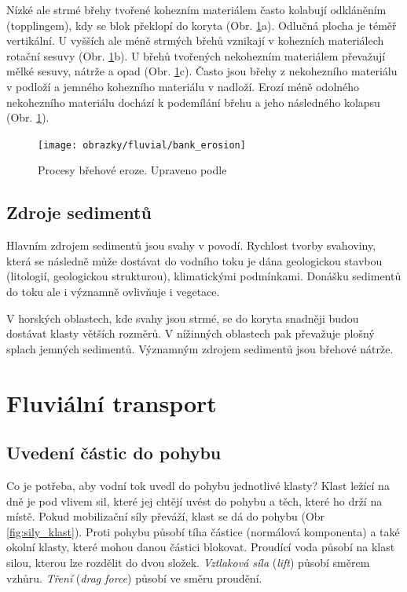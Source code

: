 Nízké ale strmé břehy tvořené kohezním materiálem často kolabují odkláněním (topplingem), kdy se blok překlopí do koryta (Obr. \ref{fig:bankerosion}a). Odlučná plocha je téměř vertikální. U vyšších ale méně strmých břehů vznikají v kohezních materiálech rotační sesuvy (Obr. \ref{fig:bankerosion}b). U břehů tvořených nekohezním materiálem převažují mělké sesuvy, nátrže a opad (Obr. \ref{fig:bankerosion}c). Často jsou břehy z nekohezního materiálu v podloží a jemného kohezního materiálu v nadloží. Erozí méně odolného nekohezního materiálu dochází k podemílání břehu a jeho následného kolapsu (Obr. \ref{fig:bankerosion}).

\begin{figure}
	\centering
	\texttt{[image: obrazky/fluvial/bank\_erosion]}
	\caption{Procesy břehové eroze. Upraveno podle \textcite{charltonFundamentalsFluvialGeomorphology2007}}
	\label{fig:bankerosion}
\end{figure}

\subsection{Zdroje sedimentů}
Hlavním zdrojem sedimentů jsou svahy v povodí. Rychlost tvorby svahoviny, která se následně může dostávat do vodního toku je dána geologickou stavbou (litologií, geologickou strukturou), klimatickými podmínkami. Donášku sedimentů do toku ale i významně ovlivňuje i vegetace. 

V horských oblastech, kde svahy jsou strmé, se do koryta snadněji budou dostávat klasty větších rozměrů. V nížinných oblastech pak převažuje plošný splach jemných sedimentů. Významným zdrojem sedimentů jsou břehové nátrže. 

\section{Fluviální transport}
\subsection{Uvedení částic do pohybu}
Co je potřeba, aby vodní tok uvedl do pohybu jednotlivé klasty? Klast ležící na dně je pod vlivem sil, které jej chtějí uvést do pohybu a těch, které ho drží na místě. Pokud mobilizační síly převáží, klast se dá do pohybu (Obr \ref{fig:sily_klast}). Proti pohybu působí tíha částice (normálová komponenta) a také okolní klasty, které mohou danou částici blokovat. Proudící voda působí na klast silou, kterou lze rozdělit do dvou složek. \emph{Vztlaková síla} (\textit{lift}) působí směrem vzhůru. \emph{Tření} (\textit{drag force}) působí ve směru proudění. 

